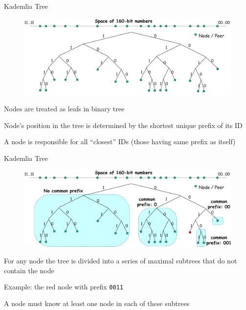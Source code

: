 \begin{frame}[t]{Kademlia Tree}

\begin{figure}
	\includegraphics[width=\textwidth]{figs/10/kad1}
\end{figure}

\BI
\item Nodes are treated as leafs in binary tree
\item Node's position in the tree is determined by the \alert{shortest unique} prefix of its ID
\item A node is responsible for all “closest” IDs (those having same prefix as itself)
\EI

\end{frame}

\begin{frame}[t]{Kademlia Tree}

\begin{figure}
	\includegraphics[width=\textwidth]{figs/10/kad2}
\end{figure}

\BI
\item For any node the tree is divided into a series of maximal subtrees that do not contain the node
\item Example: the red node with prefix \texttt{0011}
\item A node must know at least one node in each of these subtrees
\EI

\end{frame}

